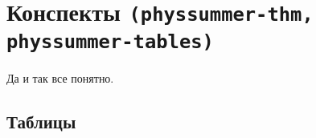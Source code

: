 \section{Конспекты \texttt{(physsummer-thm, physsummer-tables)}}

Да и так все понятно.

\subsection{Таблицы}
\label{sec:tables}